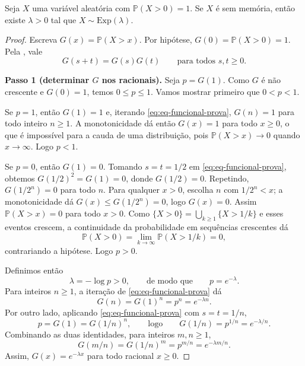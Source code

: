 \begin{theorem}\label{thm:caracterizacao-falta-memoria}
Seja $X$ uma variável aleatória com $\mathbb{P}(X>0)=1$. Se $X$ é sem
memória, então existe $\lambda>0$ tal que $X\sim\mathrm{Exp}(\lambda)$.
\end{theorem}
\begin{proof}
Escreva $G(x)=\mathbb{P}(X>x)$. Por hipótese,
$G(0)=\mathbb{P}(X>0)=1$. Pela , vale
\begin{equation}\label{eq:eq-funcional-prova}
  G(s+t)=G(s)G(t)\qquad\text{para todos } s,t\geqslant 0.
\end{equation}

\smallskip
\noindent\textbf{Passo 1 (determinar $G$ nos racionais).}
Seja $p=G(1)$. Como $G$ é não crescente e $G(0)=1$, temos
$0\leqslant p\leqslant 1$. Vamos mostrar primeiro que $0<p<1$.

Se $p=1$, então $G(1)=1$ e, iterando \eqref{eq:eq-funcional-prova},
$G(n)=1$ para todo inteiro $n\geqslant 1$. A monotonicidade dá então
$G(x)=1$ para todo $x\geqslant 0$, o que é impossível para a cauda de uma
distribuição, pois $\mathbb{P}(X>x)\to 0$ quando $x\to\infty$. Logo $p<1$.

Se $p=0$, então $G(1)=0$. Tomando $s=t=1/2$ em
\eqref{eq:eq-funcional-prova}, obtemos $G(1/2)^2=G(1)=0$, donde
$G(1/2)=0$. Repetindo, $G(1/2^n)=0$ para todo $n$. Para qualquer $x>0$,
escolha $n$ com $1/2^n<x$; a monotonicidade dá
$G(x)\leqslant G(1/2^n)=0$, logo $G(x)=0$. Assim $\mathbb{P}(X>x)=0$ para
todo $x>0$. Como $\{X>0\}=\bigcup_{k\geqslant 1}\{X>1/k\}$ e esses eventos
crescem, a continuidade da probabilidade em sequências crescentes dá
\[
  \mathbb{P}(X>0)=\lim_{k\to\infty}\mathbb{P}(X>1/k)=0,
\]
contrariando a hipótese. Logo $p>0$.

Definimos então
\[
  \lambda=-\log p>0,
  \qquad\text{de modo que}\qquad p=e^{-\lambda}.
\]
Para inteiros $n\geqslant 1$, a iteração de \eqref{eq:eq-funcional-prova}
dá
\[
  G(n)=G(1)^n=p^n=e^{-\lambda n}.
\]
Por outro lado, aplicando \eqref{eq:eq-funcional-prova} com $s=t=1/n$,
\[
  p=G(1)=G(1/n)^n,
  \qquad\text{logo}\qquad
  G(1/n)=p^{1/n}=e^{-\lambda/n}.
\]
Combinando as duas identidades, para inteiros $m,n\geqslant 1$,
\[
  G(m/n)=G(1/n)^m=p^{m/n}=e^{-\lambda m/n}.
\]
Assim, $G(x)=e^{-\lambda x}$ para todo racional $x\geqslant 0$.


\end{proof}
